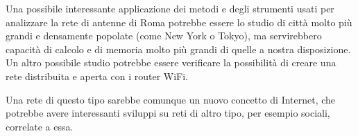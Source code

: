 Una possibile interessante applicazione dei metodi e degli strumenti usati per analizzare la rete di antenne di Roma potrebbe essere lo studio di città molto più grandi e densamente popolate (come New York o Tokyo), ma servirebbero capacità di calcolo e di memoria molto più grandi di quelle a nostra disposizione. Un altro possibile studio potrebbe essere verificare la possibilità di creare una rete distribuita e aperta con i router WiFi.

Una rete di questo tipo sarebbe comunque un nuovo concetto di Internet, che potrebbe avere interessanti sviluppi su reti di altro tipo, per esempio sociali, correlate a essa.